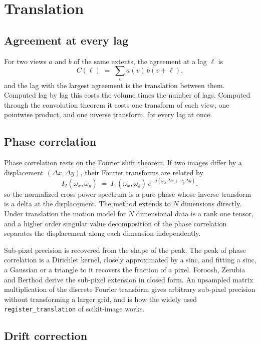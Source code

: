 \chapter{Translation}

\section{Agreement at every lag}

For two views \(a\) and \(b\) of the same extents, the agreement at a lag \(\ell\) is
\[
C(\ell) \;=\; \sum_{v} a(v)\, b(v + \ell),
\]
and the lag with the largest agreement is the translation between them. Computed lag by lag this
costs the volume times the number of lags. Computed through the convolution theorem it costs one
transform of each view, one pointwise product, and one inverse transform, for every lag at once.

\section{Phase correlation}

Phase correlation rests on the Fourier shift theorem. If two images differ by a displacement
\((\Delta x, \Delta y)\), their Fourier transforms are related by
\[
I_2(\omega_x, \omega_y) \;=\; I_1(\omega_x, \omega_y)\, e^{-j(\omega_x \Delta x + \omega_y \Delta y)},
\]
so the normalized cross power spectrum is a pure phase whose inverse transform is a delta at the
displacement. The method extends to \(N\) dimensions directly. Under translation the motion model
for \(N\) dimensional data is a rank one tensor, and a higher order singular value decomposition of
the phase correlation separates the displacement along each dimension independently.

Sub-pixel precision is recovered from the shape of the peak. The peak of phase correlation is a
Dirichlet kernel, closely approximated by a sinc, and fitting a sinc, a Gaussian or a triangle to it
recovers the fraction of a pixel. Foroosh, Zerubia and Berthod derive the sub-pixel extension in
closed form. An upsampled matrix multiplication of the discrete Fourier transform gives arbitrary
sub-pixel precision without transforming a larger grid, and is how the widely used
\texttt{register\_translation} of scikit-image works.

\section{Drift correction}

